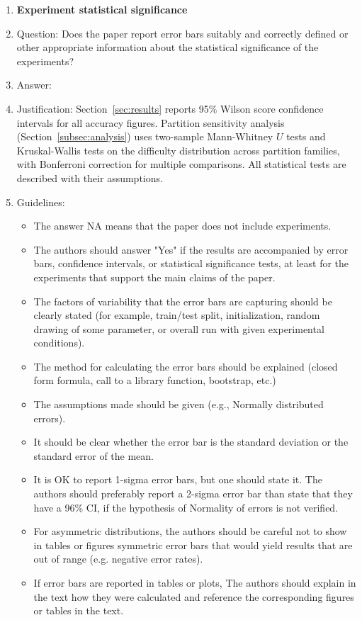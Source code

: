 \documentclass{article}
\theoremstyle{definition}
\begin{document}
\begin{enumerate}
\item {\bf Experiment statistical significance}
    \item[] Question: Does the paper report error bars suitably and correctly defined or other appropriate information about the statistical significance of the experiments?
    \item[] Answer: \answerYes{}
    \item[] Justification: Section~\ref{sec:results} reports 95\% Wilson score confidence intervals for all accuracy figures. Partition sensitivity analysis (Section~\ref{subsec:analysis}) uses two-sample Mann-Whitney $U$ tests and Kruskal-Wallis tests on the difficulty distribution across partition families, with Bonferroni correction for multiple comparisons. All statistical tests are described with their assumptions.
    \item[] Guidelines:
    \begin{itemize}
        \item The answer NA means that the paper does not include experiments.
        \item The authors should answer "Yes" if the results are accompanied by error bars, confidence intervals, or statistical significance tests, at least for the experiments that support the main claims of the paper.
        \item The factors of variability that the error bars are capturing should be clearly stated (for example, train/test split, initialization, random drawing of some parameter, or overall run with given experimental conditions).
        \item The method for calculating the error bars should be explained (closed form formula, call to a library function, bootstrap, etc.)
        \item The assumptions made should be given (e.g., Normally distributed errors).
        \item It should be clear whether the error bar is the standard deviation or the standard error of the mean.
        \item It is OK to report 1-sigma error bars, but one should state it. The authors should preferably report a 2-sigma error bar than state that they have a 96\% CI, if the hypothesis of Normality of errors is not verified.
        \item For asymmetric distributions, the authors should be careful not to show in tables or figures symmetric error bars that would yield results that are out of range (e.g. negative error rates).
        \item If error bars are reported in tables or plots, The authors should explain in the text how they were calculated and reference the corresponding figures or tables in the text.
    \end{itemize}


\end{enumerate}
\end{document}
